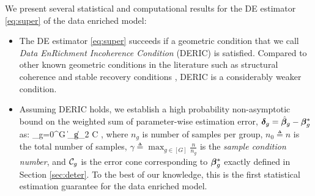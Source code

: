 We present several statistical and computational results for the DE estimator \eqref{eq:super} of the data enriched model:
\begin{itemize}[leftmargin = .4cm]
	\item The DE estimator \eqref{eq:super} succeeds if a geometric condition that we call \emph{Data EnRichment Incoherence Condition} (DERIC) is satisfied. Compared to other known geometric conditions in the literature such as structural coherence \cite{guba16} and stable recovery conditions \cite{mctr13}, DERIC is a considerably weaker condition.
	\item Assuming DERIC holds, we establish a high probability non-asymptotic bound on the weighted sum of parameter-wise estimation error, $\boldsymbol{\delta}_g = \hat{\boldsymbol{\beta}}_g - \boldsymbol{\beta}_g^*$ as:
	{\small \be
	\label{eq:errorsum}
	\sum_{g=0}^{G}   \|\ddelta_g\|_2 \leq  C \gamma {},
	\ee}
	where $n_g$ is number of samples per group, $n_0 \triangleq n$ is the total number of samples, $\gamma \triangleq \max_{g \in [G] } \frac{n}{n_g}$ is the \emph{sample condition number}, and ${\cal C}_g$ is the error cone corresponding to $\boldsymbol{\beta}_g^*$ exactly defined in Section \ref{sec:deter}.
	To the best of our knowledge, this is the first statistical estimation guarantee for the data enriched model.
	

\end{itemize}

